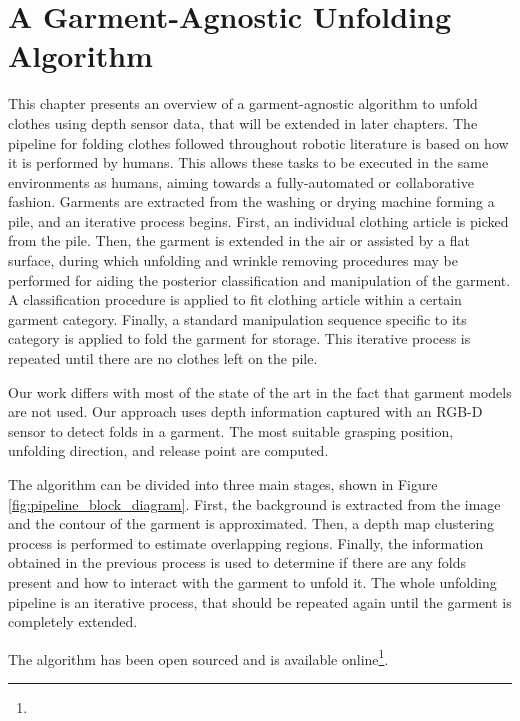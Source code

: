 \chapter{A Garment-Agnostic Unfolding Algorithm}
\label{architecture}

This chapter presents an overview of a garment-agnostic algorithm to unfold clothes using depth sensor data, that will be extended in later chapters. The pipeline for folding clothes followed throughout robotic literature is based on how it is performed by humans. This allows these tasks to be executed in the same environments as humans, aiming towards a fully-automated or collaborative fashion. Garments are extracted from the washing or drying machine forming a pile, and an iterative process begins. First, an individual clothing article is picked from the pile. Then, the garment is extended in the air or assisted by a flat surface, during which unfolding and wrinkle removing procedures may be performed for aiding the posterior classification and manipulation of the garment. A classification procedure is applied to fit clothing article within a certain garment category. Finally, a standard manipulation sequence specific to its category is applied to fold the garment for storage. This iterative process is repeated until there are no clothes left on the pile.

Our work differs with most of the state of the art in the fact that garment models are not used. Our approach uses depth information captured with an RGB-D sensor to detect folds in a garment. The most suitable grasping position, unfolding direction, and release point are computed.

The algorithm can be divided into three main stages, shown in Figure \ref{fig:pipeline_block_diagram}. First, the  background is extracted from the image and the contour of the garment is approximated. Then, a depth map clustering process is performed to estimate overlapping regions. Finally, the information obtained in the previous process is used to determine if there are any folds present and how to interact with the garment to unfold it. The whole unfolding pipeline is an iterative process, that should be repeated again until the garment is completely extended.

The algorithm has been open sourced and is available online\footnote{}.

